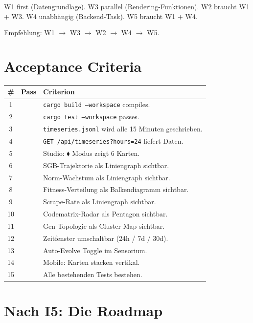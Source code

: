\documentclass[11pt,a4paper]{article}
\begin{document}
W1 first (Datengrundlage). W3 parallel (Rendering-Funktionen). 
W2 braucht W1 + W3. W4 unabh\"angig (Backend-Task). 
W5 braucht W1 + W4.

Empfehlung: W1 $\to$ W3 $\to$ W2 $\to$ W4 $\to$ W5.


\section{Acceptance Criteria}

\begin{longtable}{clp{9cm}}
\toprule
\textbf{\#} & \textbf{Pass} & \textbf{Criterion} \\
\midrule
1 & & \texttt{cargo build --workspace} compiles. \\
2 & & \texttt{cargo test --workspace} passes. \\
3 & & \texttt{timeseries.jsonl} wird alle 15 Minuten geschrieben. \\
4 & & \texttt{GET /api/timeseries?hours=24} liefert Daten. \\
5 & & Studio: $\blacklozenge$ Modus zeigt 6 Karten. \\
6 & & SGB-Trajektorie als Liniengraph sichtbar. \\
7 & & Norm-Wachstum als Liniengraph sichtbar. \\
8 & & Fitness-Verteilung als Balkendiagramm sichtbar. \\
9 & & Scrape-Rate als Liniengraph sichtbar. \\
10 & & Codematrix-Radar als Pentagon sichtbar. \\
11 & & Gen-Topologie als Cluster-Map sichtbar. \\
12 & & Zeitfenster umschaltbar (24h / 7d / 30d). \\
13 & & Auto-Evolve Toggle im Sensorium. \\
14 & & Mobile: Karten stacken vertikal. \\
15 & & Alle bestehenden Tests bestehen. \\
\bottomrule
\end{longtable}


\section{Nach I5: Die Roadmap}
\end{document}
